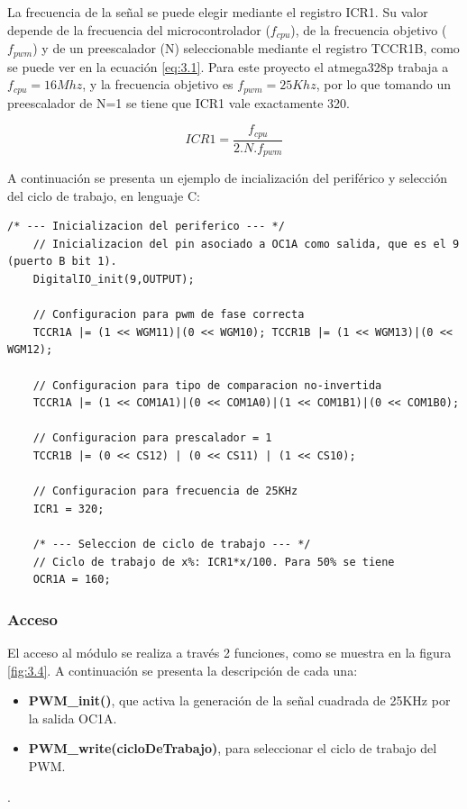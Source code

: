 La frecuencia de la señal se puede elegir mediante el registro ICR1. Su valor depende de la frecuencia del microcontrolador (\(f_{cpu}\)), de la frecuencia objetivo (\(f_{pwm}\)) y de un preescalador (N) seleccionable mediante el registro TCCR1B, como se puede ver en la ecuación \ref{eq:3.1}. Para este proyecto el atmega328p trabaja a \(f_{cpu} = 16Mhz\), y la frecuencia objetivo es \(f_{pwm} = 25Khz\), por lo que tomando un preescalador de N=1 se tiene que ICR1 vale exactamente 320.

\begin{equation} \label{eq:\theequation}
	ICR1 = \frac{f_{cpu}}{2.N.f_{pwm}}
\end{equation}

A continuación se presenta un ejemplo de incialización del periférico y selección del ciclo de trabajo, en lenguaje C: 
\begin{lstlisting}[style=CStyle]
	/* --- Inicializacion del periferico --- */
	// Inicializacion del pin asociado a OC1A como salida, que es el 9 (puerto B bit 1).
	DigitalIO_init(9,OUTPUT);
	
	// Configuracion para pwm de fase correcta
	TCCR1A |= (1 << WGM11)|(0 << WGM10); TCCR1B |= (1 << WGM13)|(0 << WGM12);
	
	// Configuracion para tipo de comparacion no-invertida
	TCCR1A |= (1 << COM1A1)|(0 << COM1A0)|(1 << COM1B1)|(0 << COM1B0);
	
	// Configuracion para prescalador = 1
	TCCR1B |= (0 << CS12) | (0 << CS11) | (1 << CS10);
	
	// Configuracion para frecuencia de 25KHz
	ICR1 = 320;
	
	/* --- Seleccion de ciclo de trabajo --- */
	// Ciclo de trabajo de x%: ICR1*x/100. Para 50% se tiene
	OCR1A = 160;
\end{lstlisting}

\subsubsection{Acceso}
El acceso al módulo se realiza a través 2 funciones, como se muestra en la figura \ref{fig:3.4}. A continuación se presenta la descripción de cada una:
\begin{itemize}
	\item \textbf{PWM\_init()}, que activa la generación de la señal cuadrada de 25KHz por la salida OC1A.
	\item \textbf{PWM\_write(cicloDeTrabajo)}, para seleccionar el ciclo de trabajo del PWM.
\end{itemize}. 

